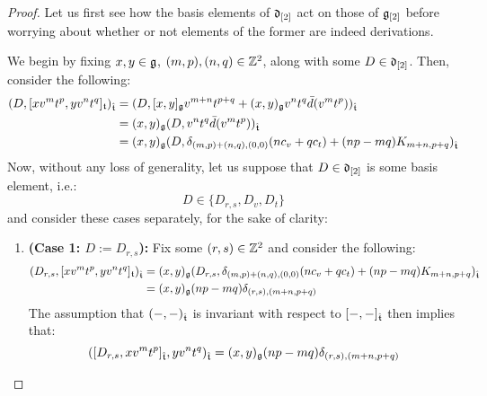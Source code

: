             \begin{proof}
                Let us first see how the basis elements of $\mathfrak{d}_{[2]}$ act on those of $\mathfrak{g}_{[2]}$ before worrying about whether or not elements of the former are indeed derivations.
            
                We begin by fixing $x, y \in \mathfrak{g}$, $(m, p), (n, q) \in \mathbb{Z}^2$, along with some $D \in \mathfrak{d}_{[2]}$. Then, consider the following:
                    $$
                        \begin{aligned}
                            ( D, [x v^m t^p, y v^n t^q]_{\mathfrak{t}} )_{\hat{\mathfrak{t}}} & = ( D, [x, y]_{\mathfrak{g}} v^{m + n} t^{p + q} + (x, y)_{\mathfrak{g}} v^n t^q \bar{d}( v^m t^p ) )_{\hat{\mathfrak{t}}}
                            \\
                            & = (x, y)_{\mathfrak{g}} ( D, v^n t^q \bar{d}( v^m t^p ) )_{\hat{\mathfrak{t}}}
                            \\
                            & = (x, y)_{\mathfrak{g}} ( D, \delta_{(m, p) + (n, q), (0, 0)} ( n c_v + q c_t ) + (np - mq) K_{m + n, p + q} )_{\hat{\mathfrak{t}}}
                        \end{aligned}
                    $$
                Now, without any loss of generality, let us suppose that $D \in \mathfrak{d}_{[2]}$ is some basis element, i.e.:
                    $$D \in \{ D_{r, s}, D_v, D_t \}$$
                and consider these cases separately, for the sake of clarity:
                \begin{enumerate}
                    \item \textbf{(Case 1: $D := D_{r, s}$):} Fix some $(r, s) \in \mathbb{Z}^2$ and consider the following: 
                        $$
                            \begin{aligned}
                                ( D_{r, s}, [x v^m t^p, y v^n t^q]_{\mathfrak{t}} )_{\hat{\mathfrak{t}}} & = (x, y)_{\mathfrak{g}} ( D_{r, s}, \delta_{(m, p) + (n, q), (0, 0)} ( n c_v + q c_t ) + (np - mq) K_{m + n, p + q} )_{\hat{\mathfrak{t}}}
                                \\
                                & = (x, y)_{\mathfrak{g}} (np - mq) \delta_{(r, s), (m + n, p + q)}
                            \end{aligned}
                        $$
                    The assumption that $(-, -)_{\hat{\mathfrak{t}}}$ is invariant with respect to $[-, -]_{\hat{\mathfrak{t}}}$ then implies that:
                        $$( [D_{r, s}, x v^m t^p]_{\hat{\mathfrak{t}}}, y v^n t^q )_{\hat{\mathfrak{t}}} = (x, y)_{\mathfrak{g}} (np - mq) \delta_{(r, s), (m + n, p + q)}$$

\end{enumerate}
\end{proof}
